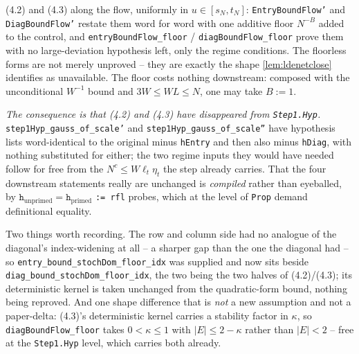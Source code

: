 \begin{lemma}\label{lem:entrybound-time}
  \leanok{}
  (4.2) and (4.3) along the flow, uniformly in $u\in[s_N,t_N]$: \texttt{EntryBoundFlow'} and
  \texttt{DiagBoundFlow'} restate them word for word with one additive floor $N^{-B}$ added to the
  control, and \texttt{entryBoundFlow\_floor} / \texttt{diagBoundFlow\_floor} prove them with no
  large-deviation hypothesis left, only the regime conditions.  The floorless forms are not merely
  unproved -- they are exactly the shape \ref{lem:ldenetclose} identifies as unavailable.  The
  floor costs nothing downstream: composed with the unconditional $W^{-1}$ bound and
  $3W\le WL\le N$, one may take $B:=1$.

  \emph{The consequence is that (4.2) and (4.3) have disappeared from \texttt{Step1.Hyp}.}
  \texttt{step1Hyp\_gauss\_of\_scale'} and \texttt{step1Hyp\_gauss\_of\_scale''} have hypothesis
  lists word-identical to the original minus \texttt{hEntry} and then also minus \texttt{hDiag},
  with nothing substituted for either; the two regime inputs they would have needed follow for
  free from the $N^c\le W\ell_t\eta_t$ the step already carries.  That the four downstream
  statements really are unchanged is \emph{compiled} rather than eyeballed, by
  $\texttt{h}_{\text{unprimed}}=\texttt{h}_{\text{primed}}$ \texttt{:= rfl} probes, which at the
  level of \texttt{Prop} demand definitional equality.

  Two things worth recording.  The row and column side had no analogue of the diagonal's
  index-widening at all -- a sharper gap than the one the diagonal had -- so
  \texttt{entry\_bound\_stochDom\_floor\_idx} was supplied and now sits beside
  \texttt{diag\_bound\_stochDom\_floor\_idx}, the two being the two halves of (4.2)/(4.3); its
  deterministic kernel is taken unchanged from the quadratic-form bound, nothing being reproved.
  And one shape difference that is \emph{not} a new assumption and not a paper-delta: (4.3)'s
  deterministic kernel carries a stability factor in $\kappa$, so \texttt{diagBoundFlow\_floor}
  takes $0<\kappa\le1$ with $|E|\le2-\kappa$ rather than $|E|<2$ -- free at the
  \texttt{Step1.Hyp} level, which carries both already.
\end{lemma}
